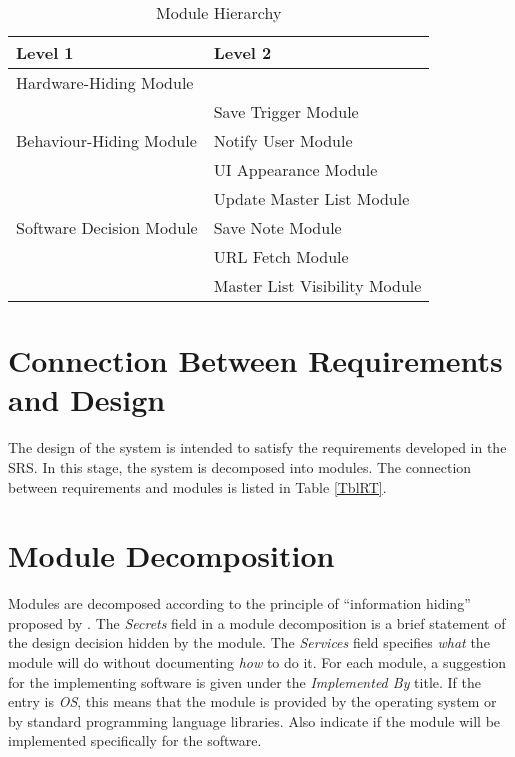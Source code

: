 \documentclass[12pt, titlepage]{article}
\begin{document}
\begin{table}[h!]
\centering
\begin{tabular}{p{} p{}}
\toprule
\textbf{Level 1} & \textbf{Level 2}\\
\midrule

{Hardware-Hiding Module} & ~ \\
\midrule

\multirow{3}{0.3\textwidth}{Behaviour-Hiding Module} & Save Trigger Module\\
& Notify User Module\\
& UI Appearance Module\\
\midrule

\multirow{3}{0.3\textwidth}{Software Decision Module} & {
	Update Master List Module}\\
& Save Note Module\\
& URL Fetch Module\\
& Master List Visibility Module\\
\bottomrule

\end{tabular}
\caption{Module Hierarchy}
\label{TblMH}
\end{table}

\section{Connection Between Requirements and Design} \label{SecConnection}

The design of the system is intended to satisfy the requirements developed in
the SRS. In this stage, the system is decomposed into modules. The connection
between requirements and modules is listed in Table \ref{TblRT}.

\section{Module Decomposition} \label{SecMD}

Modules are decomposed according to the principle of ``information hiding''
proposed by \citet{ParnasEtAl1984}. The \emph{Secrets} field in a module
decomposition is a brief statement of the design decision hidden by the
module. The \emph{Services} field specifies \emph{what} the module will do
without documenting \emph{how} to do it. For each module, a suggestion for the
implementing software is given under the \emph{Implemented By} title. If the
entry is \emph{OS}, this means that the module is provided by the operating
system or by standard programming language libraries.  Also indicate if the
module will be implemented specifically for the software.
\end{document}
